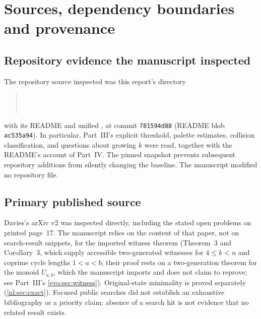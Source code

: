 \documentclass[11pt,a4paper]{article}
\numberwithin{equation}{section}
\theoremstyle{definition}
\theoremstyle{remark}
\begin{document}
\section{Sources, dependency boundaries and provenance}\label{nl:sec:audit}

\subsection{Repository evidence the manuscript inspected}
The repository source inspected was this report's directory
\begin{quote}\small
{}\\
\\
\end{quote}
with its README and unified , at commit
\texttt{781594d88} (README blob \texttt{ac535a94}). In particular,
Part~III's explicit threshold, palette estimates, collision
classification, and questions about growing $k$ were read, together with
the README's account of Part~IV. The pinned snapshot prevents subsequent
repository additions from silently changing the baseline. The manuscript
modified no repository file.

\subsection{Primary published source}
Davies's arXiv v2 \cite{Davies2017} was inspected directly, including the
stated open problems on printed page~17. The manuscript relies on the
content of that paper, not on search-result snippets, for the imported
witness theorem (Theorem~3 and Corollary~3, which supply accessible
two-generated witnesses for $4\le k<n$ and coprime cycle lengths
$1<a<b$; their proof rests on a two-generation theorem for the monoid
$U_{a,b}$, which the manuscript imports and does not claim to reprove; see
Part~III's \cref{evo:sec:witness}). Original-state minimality is proved
separately (\cref{nl:sec:exact}). Focused public searches did not establish
an exhaustive bibliography or a priority claim; absence of a search hit is
not evidence that no related result exists.
\end{document}
